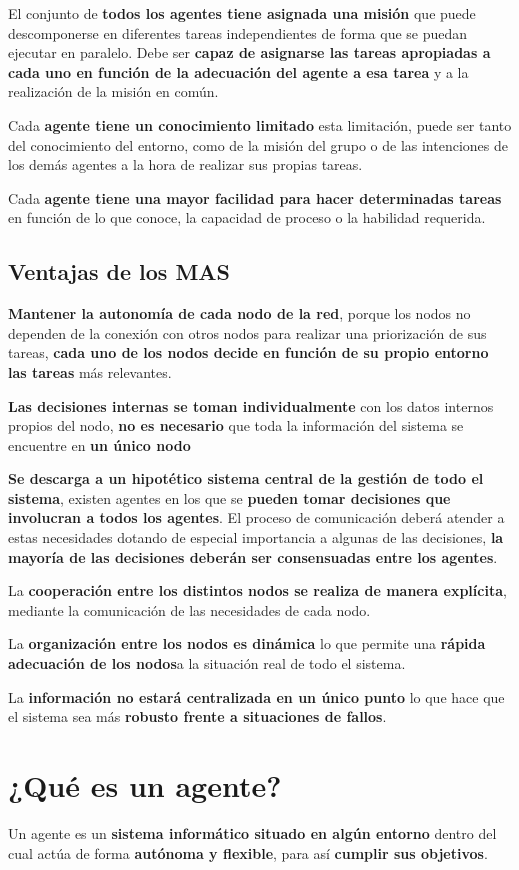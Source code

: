 \documentclass[12pt, twoside, openright]{report} %
\begin{document}
El conjunto de \textbf{todos los agentes tiene asignada una misión} que puede descomponerse en diferentes tareas independientes de forma que se puedan ejecutar en paralelo. Debe ser \textbf{capaz de asignarse las tareas apropiadas a cada uno en función de la adecuación del agente a esa tarea} y a la realización de la misión en común.

Cada \textbf{agente tiene un conocimiento limitado} esta limitación, puede ser tanto del conocimiento del entorno, como de la misión del grupo o de las intenciones de los demás agentes a la hora de realizar sus propias tareas.

Cada \textbf{agente tiene una mayor facilidad para hacer determinadas tareas} en función de lo que conoce, la capacidad de proceso o la habilidad requerida.

\subsection{Ventajas de los MAS}
\textbf{Mantener la autonomía de cada nodo de la red}, porque los nodos no dependen de la conexión con otros nodos para realizar una priorización de sus tareas, \textbf{cada uno de los nodos decide en función de su propio entorno las tareas} más relevantes.

\textbf{Las decisiones internas se toman individualmente} con los datos internos propios del nodo, \textbf{no es necesario} que toda la información del sistema se encuentre en \textbf{un único nodo}

\textbf{Se descarga a un hipotético sistema central de la gestión de todo el sistema}, existen agentes en los que se \textbf{pueden tomar decisiones que involucran a todos los agentes}. El proceso de comunicación deberá atender a estas necesidades dotando de especial importancia a algunas de las decisiones, \textbf{la mayoría de las decisiones deberán ser consensuadas entre los agentes}.

La \textbf{cooperación entre los distintos nodos se realiza de manera explícita}, mediante la comunicación de las necesidades de cada nodo.

La \textbf{organización entre los nodos es dinámica} lo que permite una \textbf{rápida adecuación de los nodos}a la situación real de todo el sistema.

La \textbf{información no estará centralizada en un único punto} lo que hace que el sistema sea más \textbf{robusto frente a situaciones de fallos}.

\section{¿Qué es un agente?}
Un agente es un \textbf{sistema informático situado en algún entorno} dentro del cual actúa de forma \textbf{autónoma y flexible}, para así \textbf{cumplir sus objetivos}.
\end{document}
